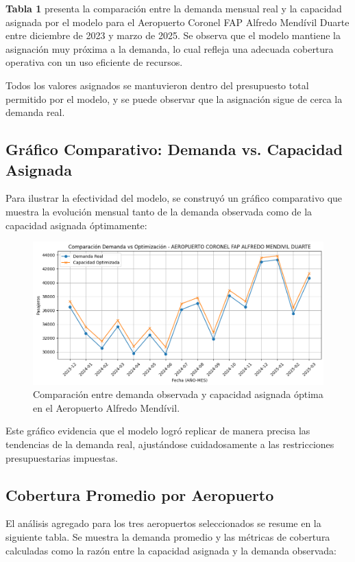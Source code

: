 \documentclass[11pt, a4paper, twocolumn]{article}
\begin{document}
\textbf{Tabla 1} presenta la comparación entre la demanda mensual real y la capacidad asignada por el modelo para el Aeropuerto Coronel FAP Alfredo Mendívil Duarte entre diciembre de 2023 y marzo de 2025. Se observa que el modelo mantiene la asignación muy próxima a la demanda, lo cual refleja una adecuada cobertura operativa con un uso eficiente de recursos.

Todos los valores asignados se mantuvieron dentro del presupuesto total permitido por el modelo, y se puede observar que la asignación sigue de cerca la demanda real.
\subsection{Gráfico Comparativo: Demanda vs. Capacidad Asignada}

Para ilustrar la efectividad del modelo, se construyó un gráfico comparativo que muestra la evolución mensual tanto de la demanda observada como de la capacidad asignada óptimamente:

\begin{figure}[H]
\centering
\includegraphics[width=\columnwidth]{Captura de pantalla 2025-06-10 231247.png}
\caption{Comparación entre demanda observada y capacidad asignada óptima en el Aeropuerto Alfredo Mendívil.}
\label{fig:comparacion_demanda_capacidad}
\end{figure}

Este gráfico evidencia que el modelo logró replicar de manera precisa las tendencias de la demanda real, ajustándose cuidadosamente a las restricciones presupuestarias impuestas.

\subsection{Cobertura Promedio por Aeropuerto}

El análisis agregado para los tres aeropuertos seleccionados se resume en la siguiente tabla. Se muestra la demanda promedio y las métricas de cobertura calculadas como la razón entre la capacidad asignada y la demanda observada:
\end{document}

